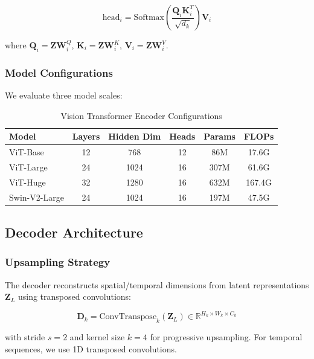 \documentclass[12pt,a4paper]{article}
\begin{document}
\begin{equation}
\text{head}_i = \text{Softmax}\left(\frac{\mathbf{Q}_i \mathbf{K}_i^T}{\sqrt{d_k}}\right) \mathbf{V}_i
\end{equation}

where $\mathbf{Q}_i = \mathbf{Z} \mathbf{W}_i^Q$, $\mathbf{K}_i = \mathbf{Z} \mathbf{W}_i^K$, $\mathbf{V}_i = \mathbf{Z} \mathbf{W}_i^V$.

\subsubsection{Model Configurations}

We evaluate three model scales:

\begin{table}[H]
\centering
\caption{Vision Transformer Encoder Configurations}
\begin{tabular}{lccccc}
\toprule
\textbf{Model} & \textbf{Layers} & \textbf{Hidden Dim} & \textbf{Heads} & \textbf{Params} & \textbf{FLOPs} \\
\midrule
ViT-Base & 12 & 768 & 12 & 86M & 17.6G \\
ViT-Large & 24 & 1024 & 16 & 307M & 61.6G \\
ViT-Huge & 32 & 1280 & 16 & 632M & 167.4G \\
Swin-V2-Large & 24 & 1024 & 16 & 197M & 47.5G \\
\bottomrule
\end{tabular}
\end{table}

\subsection{Decoder Architecture}

\subsubsection{Upsampling Strategy}

The decoder reconstructs spatial/temporal dimensions from latent representations $\mathbf{Z}_L$ using transposed convolutions:

\begin{equation}
\mathbf{D}_k = \text{ConvTranspose}_{k}(\mathbf{Z}_L) \in \mathbb{R}^{H_k \times W_k \times C_k}
\end{equation}

with stride $s=2$ and kernel size $k=4$ for progressive upsampling. For temporal sequences, we use 1D transposed convolutions.
\end{document}
